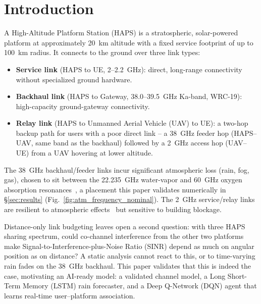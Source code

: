 \documentclass[]{ieeeaccess}
\begin{document}
\titlepgskip=-15pt

\maketitle

\section{Introduction}

A High-Altitude Platform Station (HAPS) is a stratospheric, solar-powered platform at approximately 20~km altitude with a fixed service footprint of up to 100~km radius. It connects to the ground over three link types:

\begin{itemize}\setlength{\itemsep}{1pt}
  \item \textbf{Service link} (HAPS to UE, 2--2.2~GHz): direct, long-range connectivity without specialized ground hardware.
  \item \textbf{Backhaul link} (HAPS to Gateway, 38.0--39.5~GHz Ka-band, WRC-19): high-capacity ground-gateway connectivity.
  \item \textbf{Relay link} (HAPS to Unmanned Aerial Vehicle (UAV) to UE): a two-hop backup path for users with a poor direct link -- a 38~GHz feeder hop (HAPS--UAV, same band as the backhaul) followed by a 2~GHz access hop (UAV--UE) from a UAV hovering at lower altitude.
\end{itemize}

The 38~GHz backhaul/feeder links incur significant atmospheric loss (rain, fog, gas), chosen to sit between the 22.235~GHz water-vapor and 60~GHz oxygen absorption resonances~\cite{itu_p676}, a placement this paper validates numerically in \S\ref{sec:results} (Fig.~\ref{fig:atm_frequency_nominal}). The 2~GHz service/relay links are resilient to atmospheric effects~\cite{itu_p618} but sensitive to building blockage.

Distance-only link budgeting leaves open a second question: with three HAPS sharing spectrum, could co-channel interference from the other two platforms make Signal-to-Interference-plus-Noise Ratio (SINR) depend as much on angular position as on distance? A static analysis cannot react to this, or to time-varying rain fades on the 38~GHz backhaul. This paper validates that this is indeed the case, motivating an AI-ready model: a validated channel model, a Long Short-Term Memory (LSTM) rain forecaster, and a Deep Q-Network (DQN) agent that learns real-time user--platform association.
\end{document}
